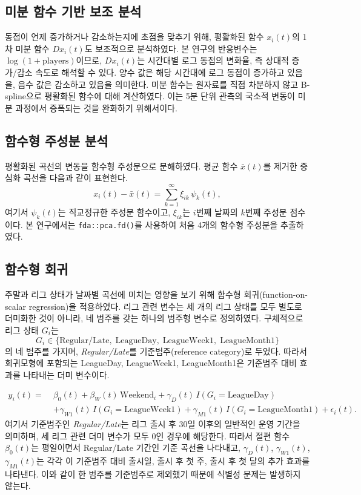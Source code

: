 \documentclass[11pt,a4paper]{article}
\begin{document}
\subsection{미분 함수 기반 보조 분석}
동접이 언제 증가하거나 감소하는지에 초점을 맞추기 위해, 평활화된 함수 $x_i(t)$의 1차 미분 함수 $D x_i(t)$도 보조적으로 분석하였다. 본 연구의 반응변수는 $\log(1+\mathrm{players})$이므로, $D x_i(t)$는 시간대별 로그 동접의 변화율, 즉 상대적 증가/감소 속도로 해석할 수 있다. 양수 값은 해당 시간대에 로그 동접이 증가하고 있음을, 음수 값은 감소하고 있음을 의미한다. 미분 함수는 원자료를 직접 차분하지 않고 B-spline으로 평활화된 함수에 대해 계산하였다. 이는 5분 단위 관측의 국소적 변동이 미분 과정에서 증폭되는 것을 완화하기 위해서이다.

\subsection{함수형 주성분 분석}
평활화된 곡선의 변동을 함수형 주성분으로 분해하였다. 평균 함수 $\bar{x}(t)$를 제거한 중심화 곡선을 다음과 같이 표현한다.
\begin{equation}
    x_i(t) - \bar{x}(t) = \sum_{k=1}^{\infty} \xi_{ik}\,\psi_k(t),
\end{equation}
여기서 $\psi_k(t)$는 직교정규한 주성분 함수이고, $\xi_{ik}$는 $i$번째 날짜의 $k$번째 주성분 점수이다. 본 연구에서는 \texttt{fda::pca.fd()}를 사용하여 처음 4개의 함수형 주성분을 추출하였다.


\subsection{함수형 회귀}
주말과 리그 상태가 날짜별 곡선에 미치는 영향을 보기 위해 함수형 회귀(function-on-scalar regression)을 적용하였다. 리그 관련 변수는 세 개의 리그 상태를 모두 별도로 더미화한 것이 아니라, 네 범주를 갖는 하나의 범주형 변수로 정의하였다. 구체적으로 리그 상태 $G_i$는
\[
G_i \in \{\mathrm{Regular/Late},\; \mathrm{LeagueDay},\; \mathrm{LeagueWeek1},\; \mathrm{LeagueMonth1}\}
\]
의 네 범주를 가지며, \textit{Regular/Late}를 기준범주(reference category)로 두었다. 따라서 회귀모형에 포함되는 LeagueDay, LeagueWeek1, LeagueMonth1은 기준범주 대비 효과를 나타내는 더미 변수이다.

\begin{equation}
\begin{aligned}
    y_i(t) =\;& \beta_0(t)
    + \beta_W(t)\,\mathrm{Weekend}_i
    + \gamma_D(t)\,I(G_i=\mathrm{LeagueDay}) \\
    &+ \gamma_{W1}(t)\,I(G_i=\mathrm{LeagueWeek1})
    + \gamma_{M1}(t)\,I(G_i=\mathrm{LeagueMonth1})
    + \epsilon_i(t).
\end{aligned}
\end{equation}
여기서 기준범주인 \textit{Regular/Late}는 리그 출시 후 30일 이후의 일반적인 운영 기간을 의미하며, 세 리그 관련 더미 변수가 모두 0인 경우에 해당한다. 따라서 절편 함수 $\beta_0(t)$는 평일이면서 Regular/Late 기간인 기준 곡선을 나타내고, $\gamma_D(t)$, $\gamma_{W1}(t)$, $\gamma_{M1}(t)$는 각각 이 기준범주 대비 출시일, 출시 후 첫 주, 출시 후 첫 달의 추가 효과를 나타낸다. 이와 같이 한 범주를 기준범주로 제외했기 때문에 식별성 문제는 발생하지 않는다.
\end{document}
